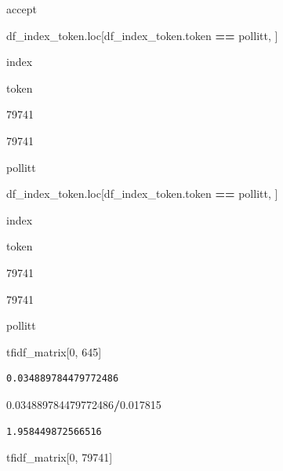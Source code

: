 \documentclass[
  11pt,
  a4paper,
]{article}
\newenvironment{Shaded}{\begin{snugshade}}{\end{snugshade}}
\newcommand{\DecValTok}[1]{\textcolor[rgb]{0.00,0.00,0.81}{#1}}
\newcommand{\FloatTok}[1]{\textcolor[rgb]{0.00,0.00,0.81}{#1}}
\newcommand{\NormalTok}[1]{#1}
\newcommand{\OperatorTok}[1]{\textcolor[rgb]{0.81,0.36,0.00}{\textbf{#1}}}
\newcommand{\StringTok}[1]{\textcolor[rgb]{0.31,0.60,0.02}{#1}}
\begin{document}
accept

\begin{Shaded}
\begin{Highlighting}[]
\NormalTok{df\_index\_token.loc[df\_index\_token.token }\OperatorTok{==} \StringTok{\textquotesingle{}pollitt\textquotesingle{}}\NormalTok{, ]}
\end{Highlighting}
\end{Shaded}

index

token

79741

79741

pollitt

\begin{Shaded}
\begin{Highlighting}[]
\NormalTok{df\_index\_token.loc[df\_index\_token.token }\OperatorTok{==} \StringTok{\textquotesingle{}pollitt\textquotesingle{}}\NormalTok{, ]}
\end{Highlighting}
\end{Shaded}

index

token

79741

79741

pollitt

\begin{Shaded}
\begin{Highlighting}[]
\NormalTok{tfidf\_matrix[}\DecValTok{0}\NormalTok{, }\DecValTok{645}\NormalTok{]}
\end{Highlighting}
\end{Shaded}

\begin{verbatim}
0.034889784479772486
\end{verbatim}

\begin{Shaded}
\begin{Highlighting}[]
\FloatTok{0.034889784479772486}\OperatorTok{/}\FloatTok{0.017815}
\end{Highlighting}
\end{Shaded}

\begin{verbatim}
1.958449872566516
\end{verbatim}

\begin{Shaded}
\begin{Highlighting}[]
\NormalTok{tfidf\_matrix[}\DecValTok{0}\NormalTok{, }\DecValTok{79741}\NormalTok{]}
\end{Highlighting}
\end{Shaded}
\end{document}
